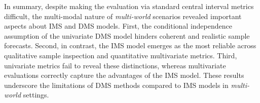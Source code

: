 \documentclass[a4paper,oneside,bibliography=totoc]{scrbook}
\begin{document}
\noindent
In summary, despite making the evaluation via standard central interval metrics difficult, the multi-modal nature of \textit{multi-world} scenarios revealed important aspects about IMS and DMS models.
First, the conditional independence assumption of the univariate DMS model hinders coherent and realistic sample forecasts.
Second, in contrast, the IMS model emerges as the most reliable across qualitative sample inspection and quantitative multivariate metrics.
Third, univariate metrics fail to reveal these distinctions, whereas multivariate evaluations correctly capture the advantages of the IMS model.
These results underscore the limitations of DMS methods compared to IMS models in \textit{multi-world} settings.
\end{document}
